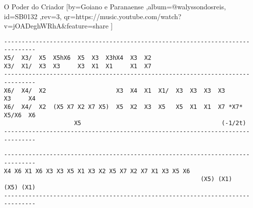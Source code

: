 \beginsong
{O Poder do Criador %
}[by={Goiano e Paranaense %
},album={@walyssondosreis},
id={SB0132 %
},rev={3}, %
qr={https://music.youtube.com/watch?v=jOADeghWRhA&feature=share %
}]
\lstset{basicstyle=\scriptsize\bf} %
\begin{lstlisting}
-------------------------------------------------------------------------------
X5/  X3/  X5  X5hX6  X5  X3  X3hX4  X3  X2
X3/  X1/  X3  X3     X3  X1  X1     X1  X7
-------------------------------------------------------------------------------
X6/  X4/  X2                    X3  X4  X1  X1/  X3  X3  X3  X3      X3     X4
X6/  X4/  X2  (X5 X7 X2 X7 X5)  X5  X2  X3  X5   X5  X1  X1  X7 *X7*  X5/X6  X6
                    X5                                        (-1/2t)
-------------------------------------------------------------------------------
\end{lstlisting}
\begin{lstlisting}
-------------------------------------------------------------------------------
X4 X6 X1 X6 X3 X3 X5 X1 X3 X2 X5 X7 X2 X7 X1 X3 X5 X6 
                                                        (X5) (X1)   (X5) (X1)
-------------------------------------------------------------------------------
\end{lstlisting}
\beginverse 

